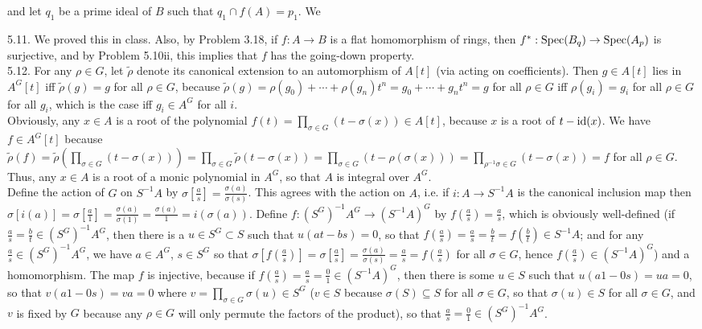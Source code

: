 \documentclass[11pt]{article}
\begin{document}
and let $q_1$ be a prime ideal of $B$ such that $q_1\cap f(A)=p_1$. We

\num{5.11.} We proved this in class. Also, by Problem 3.18, if $f:A\rightarrow
B$ is a flat homomorphism of rings, then $f^*:\operatorname{Spec}(B_q)\rightarrow\operatorname{Spec}(A_p)$
is surjective, and by Problem 5.10ii, this implies that $f$ has the going-down
property.    \\

\num{5.12.} For any $\rho\in G$, let $\tilde{\rho}$ denote its canonical
extension to an automorphism of $A[t]$ (via acting on coefficients). Then
$g\in A[t]$ lies in $A^G[t]$ iff $\tilde{\rho}(g)=g$ for all $\rho\in G$,
because $\tilde{\rho}(g)=\rho(g_0)+\cdots+\rho(g_n)t^n=g_0+\cdots+g_nt^n=g$
for all $\rho\in G$ iff $\rho(g_i)=g_i$ for all $\rho\in G$ for all $g_i$,
which is the case iff $g_i\in A^G$ for all $i$. \\

Obviously, any $x\in A$ is a root of the polynomial $f(t)=\prod_{\sigma\in
G}(t-\sigma(x))\in A[t]$, because $x$ is a root of $t-\operatorname{id}(x)$. We have $f\in
A^G[t]$ because $\tilde{\rho}(f)=\tilde{\rho}\left(\prod_{\sigma\in
G}(t-\sigma(x))\right)=\prod_{\sigma\in
G}\tilde{\rho}(t-\sigma(x))=\prod_{\sigma\in
G}(t-\rho(\sigma(x)))=\prod_{\rho^{-1}\sigma\in G}(t-\sigma(x))=f$ for all
$\rho\in G$. Thus, any $x\in A$ is a root of a monic polynomial in $A^G$,
so that $A$ is integral over $A^G$.   \\

Define the action of $G$ on $S^{-1}A$ by
$\sigma[\frac{a}{s}]=\frac{\sigma(a)}{\sigma(s)}$. This agrees with the action
on $A$, i.e. if $i:A\rightarrow S^{-1}A$ is the canonical inclusion map then
$\sigma[i(a)]=\sigma[\frac{a}{1}]=\frac{\sigma(a)}{\sigma(1)}=\frac{\sigma(a)}{1}=i(\sigma(a))$.
Define $f:(S^G)^{-1}A^G\rightarrow (S^{-1}A)^G$ by
$f(\frac{a}{s})=\frac{a}{s}$, which is obviously well-defined
(if $\frac{a}{s}=\frac{b}{t}\in (S^G)^{-1}A^G$, then there
is a $u\in S^G\subset S$ such that $u(at-bs)=0$, so that
$f(\frac{a}{s})=\frac{a}{s}=\frac{b}{t}=f(\frac{b}{t})\in S^{-1}A$; and
for any $\frac{a}{s}\in (S^G)^{-1}A^G$, we have $a\in A^G$, $s\in S^G$ so that
$\sigma[f(\frac{a}{s})]=\sigma[\frac{a}{s}]=\frac{\sigma(a)}{\sigma(s)}=\frac{a}{s}=f(\frac{a}{s})$
for all $\sigma\in G$, hence $f(\frac{a}{s})\in (S^{-1}A)^G$)
and a homomorphism. The map $f$ is injective, because if
$f(\frac{a}{s})=\frac{a}{s}=\frac{0}{1}\in (S^{-1}A)^G$, then there is
some $u\in S$ such that $u(a1-0s)=ua=0$, so that $v(a1-0s)=va=0$ where
$v=\prod_{\sigma\in G}\sigma(u)\in S^G$ ($v\in S$ because $\sigma(S)\subseteq
S$ for all $\sigma\in G$, so that $\sigma(u)\in S$ for all $\sigma\in G$,
and $v$ is fixed by $G$ because any $\rho\in G$ will only permute the factors
of the product), so that $\frac{a}{s}=\frac{0}{1}\in (S^G)^{-1}A^G$. \\
\end{document}
